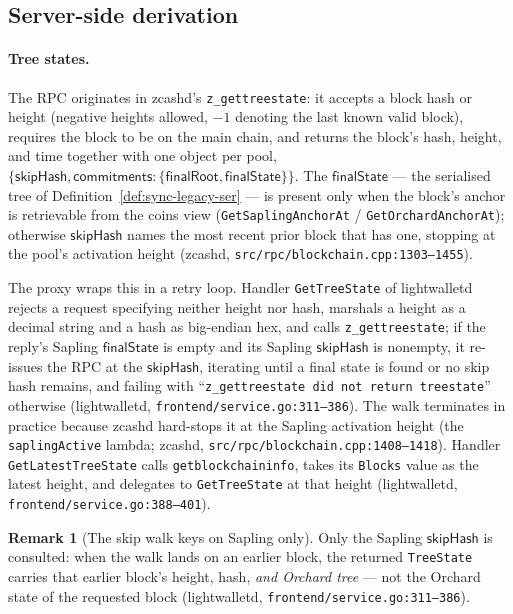 \documentclass[11pt,a4paper]{article}
\theoremstyle{definition}
\newtheorem{remark}[theorem]{Remark}
\begin{document}
\subsection{Server-side derivation}\label{sec:sync-tree-server}

\paragraph{Tree states.} The RPC originates in \textsf{zcashd}'s
\texttt{z\_gettreestate}: it accepts a block hash or height (negative
heights allowed, $-1$ denoting the last known valid block), requires the
block to be on the main chain, and returns the block's hash, height, and
time together with one object per pool,
$\{\mathsf{skipHash}, \mathsf{commitments} : \{\mathsf{finalRoot},
\mathsf{finalState}\}\}$. The $\mathsf{finalState}$ --- the serialised
tree of Definition~\ref{def:sync-legacy-ser} --- is present only when the
block's anchor is retrievable from the coins view
(\texttt{GetSaplingAnchorAt} / \texttt{GetOrchardAnchorAt}); otherwise
$\mathsf{skipHash}$ names the most recent prior block that has one,
stopping at the pool's activation height
(\textsf{zcashd}, \texttt{src/rpc/blockchain.cpp:1303--1455}).

The proxy wraps this in a retry loop. Handler \texttt{GetTreeState} of
\textsf{lightwalletd} rejects a request specifying neither height nor
hash, marshals a height as a decimal string and a hash as big-endian
hex, and calls \texttt{z\_gettreestate}; if the reply's Sapling
$\mathsf{finalState}$ is empty and its Sapling $\mathsf{skipHash}$ is
nonempty, it re-issues the RPC at the $\mathsf{skipHash}$, iterating
until a final state is found or no skip hash remains, and failing with
``\texttt{z\_gettreestate did not return treestate}'' otherwise
(\textsf{lightwalletd}, \texttt{frontend/service.go:311--386}). The walk
terminates in practice because \textsf{zcashd} hard-stops it at the
Sapling activation height (the \texttt{saplingActive} lambda;
\textsf{zcashd}, \texttt{src/rpc/blockchain.cpp:1408--1418}).
Handler \texttt{GetLatestTreeState} calls \texttt{getblockchaininfo},
takes its
\texttt{Blocks} value as the latest height, and delegates to
\texttt{GetTreeState} at that height
(\textsf{lightwalletd}, \texttt{frontend/service.go:388--401}).

\begin{remark}[The skip walk keys on Sapling only]\label{rem:sync-skiphash}
Only the Sapling $\mathsf{skipHash}$ is consulted: when the walk lands on
an earlier block, the returned \texttt{TreeState} carries that earlier
block's height, hash, \emph{and Orchard tree} --- not the Orchard state
of the requested block
(\textsf{lightwalletd}, \texttt{frontend/service.go:311--386}).
\end{remark}
\end{document}
